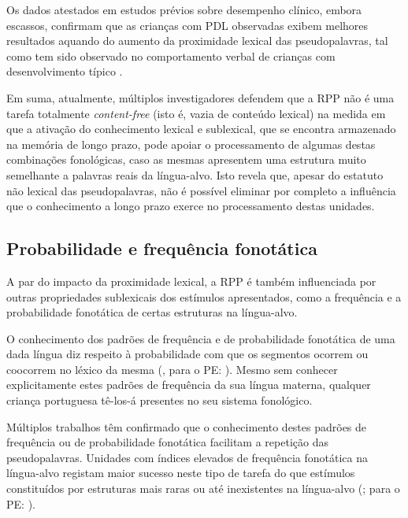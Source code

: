 \documentclass[output=paper,colorlinks,citecolor=brown,booklanguage=portuguese]{langscibook}
\begin{document}
Os dados atestados em estudos prévios sobre desempenho clínico, embora escassos, confirmam que as crianças com PDL observadas exibem melhores resultados aquando do aumento da proximidade lexical das pseudopalavras, tal como tem sido observado no comportamento verbal de crianças com desenvolvimento típico \citep{Jones2010, Munson2005}.

Em suma, atualmente, múltiplos investigadores defendem que a RPP não é uma tarefa totalmente \emph{content-free} (isto é, vazia de conteúdo lexical) na medida em que a ativação do conhecimento lexical e sublexical, que se encontra armazenado na memória de longo prazo, pode apoiar o processamento de algumas destas combinações fonológicas, caso as mesmas apresentem uma estrutura muito semelhante a palavras reais da língua-alvo. Isto revela que, apesar do estatuto não lexical das pseudopalavras, não é possível eliminar por completo a influência que o conhecimento a longo prazo exerce no processamento destas unidades.

\subsection{Probabilidade e frequência fonotática}
A par do impacto da proximidade lexical, a RPP é também influenciada por outras propriedades sublexicais dos estímulos apresentados, como a frequência e a probabilidade fonotática de certas estruturas na língua-alvo. 

O conhecimento dos padrões de frequência e de probabilidade fonotática de uma dada língua diz respeito à probabilidade com que os segmentos ocorrem ou coocorrem no léxico da mesma (\citealp{Edwards2004}, para o PE: \citealp{Coutinho2014}). Mesmo sem conhecer explicitamente estes padrões de frequência da sua língua materna, qualquer criança portuguesa tê-los-á presentes no seu sistema fonológico.

Múltiplos trabalhos têm confirmado que o conhecimento destes padrões de frequência ou de probabilidade fonotática facilitam a repetição das pseudopalavras. Unidades com índices elevados de frequência fonotática na língua-alvo registam maior sucesso neste tipo de tarefa do que estímulos constituídos por estruturas mais raras ou até inexistentes na língua-alvo (\citealp{Edwards2004, Jones2010}; para o PE: \citealp{Coutinho2014}).
\end{document}
